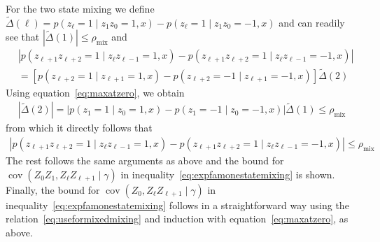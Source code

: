 \documentclass[twoside,11pt]{article}
\DeclareMathOperator{\cov}{cov}
\newcommand{\mixcoef}{\ensuremath{\rho_{\mathrm{mix}}}}
\newcommand{\paramgamma}{\gamma}
\newcommand{\condcov}[3]{\cov(#1, #2 \mid #3)}
\begin{document}
For the two state mixing we define $\widetilde{\Delta}(\ell) = p(z_{\ell}=1 \mid z_{1}z_{0}= 1,x) - p(z_{\ell} =
1 \mid z_{1}z_{0} = -1,x)$
and can readily see that $|\widetilde{\Delta}(1)|\leq \mixcoef$ and 
\begin{align*}
&|p(z_{\ell+1}z_{\ell+2}=1 \mid z_{\ell} z_{\ell-1}=1,x) -
  p(z_{\ell+1}z_{\ell+2} = 1 \mid z_{\ell} z_{\ell-1}=-1,x)| \\
 & = [p(z_{\ell+2} = 1 \mid z_{\ell+1}=1,x) -p(z_{\ell+2}=-1 \mid z_{\ell+1}=-1,x)] \tilde{\Delta}(2) 
\end{align*}
Using equation~\eqref{eq:maxatzero}, we obtain
\begin{align}
\label{eq:useformixedmixing} 
|\widetilde{\Delta}(2)| = |p(z_1 = 1 \mid z_0 = 1, x) - p(z_1 = -1 \mid z_0 = -1, x)|\widetilde{\Delta}(1)  \leq \mixcoef 
\end{align}
from which it directly follows that
\begin{align*}
|p(z_{\ell+1}z_{\ell+2}=1 \mid z_{\ell} z_{\ell-1}=1,x) -
p(z_{\ell+1}z_{\ell+2} = 1 \mid z_{\ell} z_{\ell-1}=-1,x)| \leq \mixcoef
\end{align*}
The rest follows the same arguments as above and the bound for
$\condcov{Z_0Z_1}{Z_\ell Z_{\ell+1}}{\paramgamma}$ in
inequality~\eqref{eq:expfamonestatemixing} is shown. \\

Finally, the bound for $\condcov{Z_0}{Z_\ell Z_{\ell+1}}{\paramgamma}$ in
inequality~\eqref{eq:expfamonestatemixing} follows in a straightforward way
using the relation~\eqref{eq:useformixedmixing} and induction with
equation~\eqref{eq:maxatzero}, as above.


\vskip 0.2in

\end{document}
